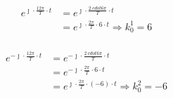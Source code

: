 \begin{task}
\begin{align*}
e^{\jmath \cdot \frac{12\pi}{T}\cdot t} &= e^{\jmath \cdot \frac{2 \ cdot 6\pi}{T}\cdot t}\\
&=e^{\jmath \cdot \frac{2\pi}{T} \cdot 6\cdot t} \Rightarrow k^1_0 = 6\\
\end{align*}

\begin{align*}
e^{-\jmath \cdot \frac{12\pi}{T}\cdot t} &= e^{-\jmath \cdot \frac{2 \ cdot 6\pi}{T}\cdot t}\\
&=e^{-\jmath \cdot \frac{2\pi}{T} \cdot 6\cdot t} \\
&=e^{\jmath \cdot \frac{2\pi}{T} \cdot \left(-6\right) \cdot t} \Rightarrow k^2_0 = -6\\
\end{align*}
  

\end{task}
